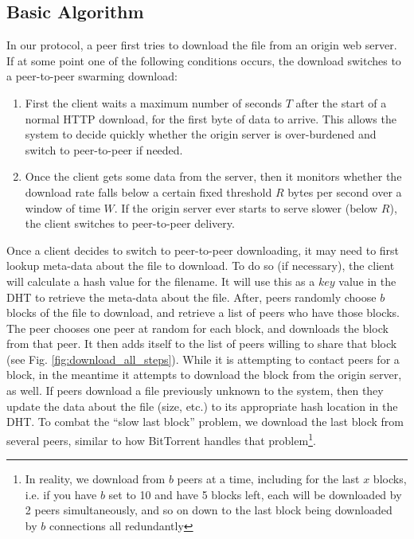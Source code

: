 \subsection{Basic Algorithm}

In our protocol, a peer first tries to download the file from an origin web server.  If at some point one of the following conditions occurs, the download switches to a peer-to-peer swarming download:
\begin{enumerate}
\item First the client waits a maximum number of seconds $T$ after the start of a normal HTTP download, for the first byte of data to arrive.  This allows the system to decide quickly whether the origin server is over-burdened and switch to peer-to-peer if needed.   
\item Once the client gets some data from the server, then it monitors whether the download rate falls below a certain fixed threshold $R$ bytes per second over a window of time $W$.  If the origin server ever starts to serve slower (below $R$), the client switches to peer-to-peer delivery.
\end{enumerate}

Once a client decides to switch to peer-to-peer downloading, it may need to first lookup meta-data about the file to download.  To do so (if necessary), the client will calculate a hash value for the filename.  It will use this as a $key$ value in the DHT to retrieve the meta-data about the file.  After, peers randomly choose $b$ blocks of the file to download, and retrieve a list of peers who have those blocks.  The peer chooses one peer at random for each block, and downloads the block from that peer.  It then adds itself to the list of peers willing to share that block (see Fig. \ref{fig:download_all_steps}).  While it is attempting to contact peers for a block, in the meantime it attempts to download the block from the origin server, as well.  If peers download a file previously unknown to the system, then they update the data about the file (size, etc.) to its appropriate hash location in the DHT.  To combat the ``slow last block'' problem,  we download the last block from several peers, similar to how BitTorrent handles that problem\footnote{In reality, we download from $b$ peers at a time, including for the last $x$ blocks, i.e. if you have $b$ set to 10 and have 5 blocks left, each will be downloaded by 2 peers simultaneously, and so on down to the last block being downloaded by $b$ connections all redundantly}.


